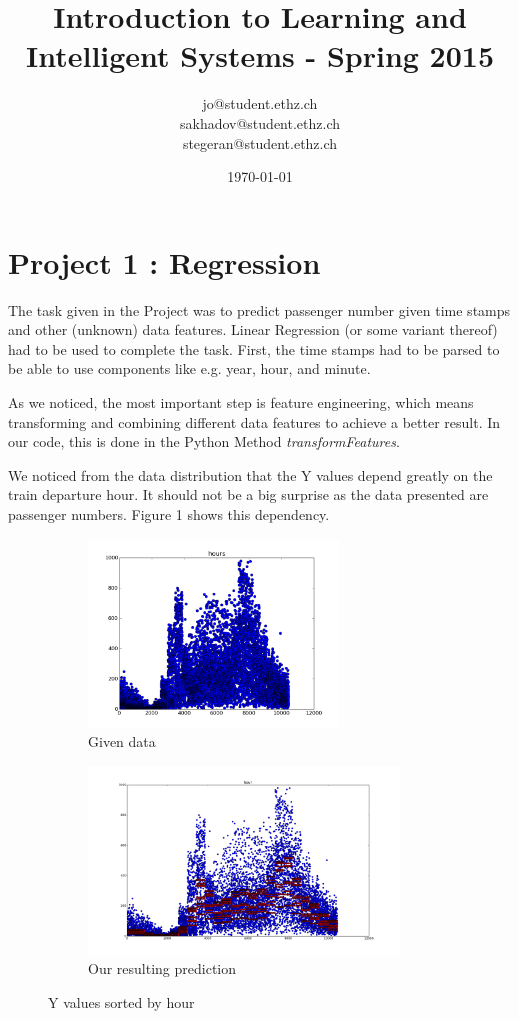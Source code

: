 \documentclass[a4paper, 11pt]{article}
\title{Introduction to Learning and Intelligent Systems - Spring 2015}
\author{jo@student.ethz.ch\\ sakhadov@student.ethz.ch\\  stegeran@student.ethz.ch\\}
\date{\today}
\begin{document}
\maketitle
\section*{Project 1 : Regression}

The task given in the Project was to predict passenger number given time stamps and other (unknown) data features. Linear Regression (or some variant thereof) had to be used to complete the task. First, the time stamps had to be parsed to be able to use components like e.g. year, hour, and minute.

As we noticed, the most important step is feature engineering, which means transforming and combining different data features to achieve a better result. In our code, this is done in the Python Method \textit{transformFeatures}.

We noticed from the data distribution that the Y values depend greatly on the train departure hour. It should not be a big surprise as the data presented are passenger numbers.
Figure 1 shows this dependency.

\begin{figure}[h]
 
\begin{subfigure}[l]{0.5\textwidth}
\includegraphics[width=0.9\linewidth, height=5cm]{Plots/hours} 
\caption{Given data}
\label{fig:subim1}
\end{subfigure}
\begin{subfigure}[r]{0.5\textwidth}
\includegraphics[width=0.9\linewidth, height=5cm]{Plots/hours_predicted}
\caption{Our resulting prediction}
\label{fig:subim2}
\end{subfigure}
 
\caption{Y values sorted by hour}
\label{fig:image2}
\end{figure}
\end{document}

